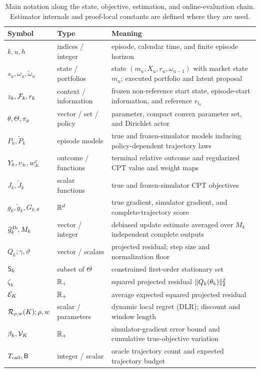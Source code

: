 \begin{table}[h]
\centering
\caption{Main notation along the state, objective, estimation, and online-evaluation chain.  Estimator internals and proof-local constants are defined where they are used.}
\label{tab:notation-core}
\small
\begin{tabularx}{\textwidth}{@{}p{}p{}X@{}}
\toprule
Symbol & Type & Meaning \\
\midrule
$k,u,h$ & indices / integer & episode, calendar time, and finite episode horizon \\
$s_u,\omega_u,\widetilde\omega_u$ & state / portfolios & state $(m_u,X_u,r_u,\omega_{u-1})$ with market state $m_u$; executed portfolio and latent proposal \\
$z_k,\mathcal F_k,r_k$ & context / information & frozen non-reference start state, episode-start information, and reference $r_{t_k}$ \\
$\theta,\Theta,\pi_\theta$ & vector / set / policy & parameter, compact convex parameter set, and Dirichlet actor \\
$P_k,\widetilde P_k$ & episode models & true and frozen-simulator models inducing policy-dependent trajectory laws \\
$Y_k,v_\pm,w_\pm^\varepsilon$ & outcome / functions & terminal relative outcome and regularized CPT value and weight maps \\
$J_k,\widetilde J_k$ & scalar functions & true and frozen-simulator CPT objectives \\
$g_k,\widetilde g_k,G_{k,\theta}$ & $\mathbb R^d$ & true gradient, simulator gradient, and complete-trajectory score \\
$\widehat g_k^{\mathrm{db}},M_k$ & vector / integer & debiased update estimate averaged over $M_k$ independent complete outputs \\
$Q_k;\gamma,\vartheta$ & vector / scalars & projected residual; step size and normalization floor \\
$\mathsf S_k$ & subset of $\Theta$ & constrained first-order stationary set \\
$\zeta_k$ & $\mathbb R_+$ & squared projected residual $\lVert Q_k(\theta_k)\rVert_2^2$ \\
$\mathcal E_K$ & $\mathbb R_+$ & average expected squared projected residual \\
$\mathcal R_{\rho,w}(K);\rho,w$ & scalar / parameters & dynamic local regret (DLR); discount and window length \\
$\beta_k,\mathcal V_K$ & $\mathbb R_+$ & simulator-gradient error bound and cumulative true-objective variation \\
$T_{\rm call},\mathsf B$ & integer / scalar & oracle trajectory count and expected trajectory budget \\
\bottomrule
\end{tabularx}
\end{table}

